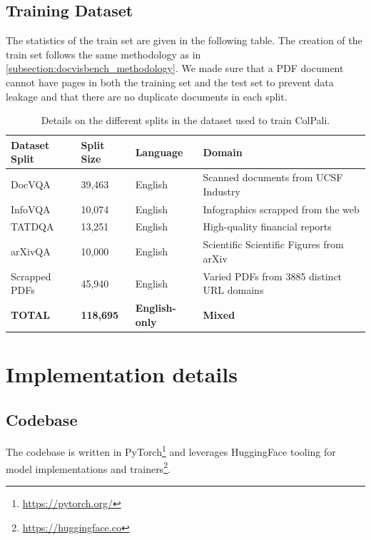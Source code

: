 \documentclass{article} %
\begin{document}
\subsection{Training Dataset}
\label{subsection: training_dataset}
The statistics of the train set are given in the following table. The creation of the train set follows the same methodology as in \autoref{subsection:docvisbench_methodology}. We made sure that a PDF document cannot have pages in both the training set and the test set to prevent data leakage and that there are no duplicate documents in each split.

\begin{table}[ht]
    \centering
    \label{tab:datasets}
    \small
    \begin{tabular}{llll}
        \toprule
        \textbf{Dataset Split} & \textbf{Split Size} & \textbf{Language} & \textbf{Domain}\\
        \midrule
        DocVQA & 39,463 & English & Scanned documents from UCSF Industry\\
        InfoVQA & 10,074 & English & Infographics scrapped from the web \\
        TATDQA & 13,251 & English & High-quality financial reports \\
        arXivQA & 10,000 & English & Scientific Scientific Figures from arXiv\\
        Scrapped PDFs & 45,940 & English & Varied PDFs from 3885 distinct URL domains\\
        \midrule
        \textbf{TOTAL} & \textbf{118,695} & \textbf{English-only} & \textbf{Mixed} \\
        \bottomrule
    \end{tabular}
    \caption{Details on the different splits in the dataset used to train ColPali.}
    \label{table:training_set_overview}
\end{table}



\section{Implementation details}

\subsection{Codebase}
The codebase is written in PyTorch\footnote{\url{https://pytorch.org/}} and leverages HuggingFace tooling for model implementations and trainers\footnote{\url{https://huggingface.co}}.
\end{document}
